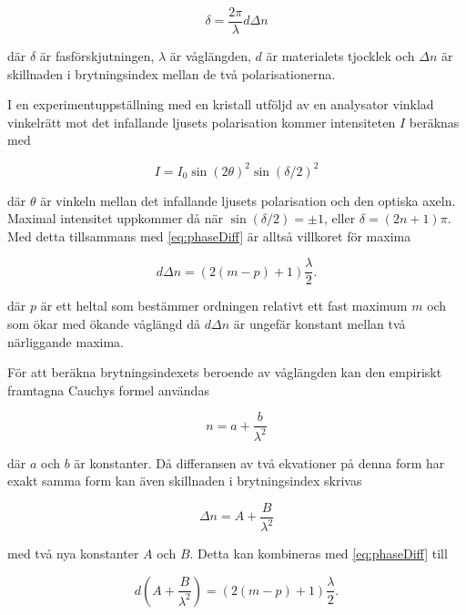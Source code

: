 \documentclass[a4paper]{article}
\begin{document}
\begin{equation}
	\delta = \frac{2\pi}{\lambda} d \Delta n
	\label{eq:phaseDiff}
\end{equation}

där $\delta$ är fasförskjutningen, $\lambda$ är våglängden, $d$ är materialets tjocklek och $\Delta n$ är skillnaden i brytningsindex mellan de två polarisationerna.

I en experimentuppställning med en kristall utföljd av en analysator vinklad vinkelrätt mot det infallande ljusets polarisation kommer intensiteten $I$ beräknas med \cite{labManual}

\begin{equation}
	I = I_0 \sin\left(2\theta\right)^2 \sin\left(\delta / 2\right)^2
\end{equation}

där $\theta$ är vinkeln mellan det infallande ljusets polarisation och den optiska axeln. Maximal intensitet uppkommer då när $\sin\left(\delta / 2\right) = \pm 1$, eller $\delta = \left(2 n + 1\right)\pi$. \cite{labManual} Med detta tillsammans med \eqref{eq:phaseDiff} är alltså villkoret för maxima

\begin{equation}
	d \Delta n = \left(2 (m - p) + 1\right)\frac{\lambda}{2}\text{.}
	\label{eq:deltaMax}
\end{equation}

där $p$ är ett heltal som bestämmer ordningen relativt ett fast maximum $m$ och som ökar med ökande våglängd då $d \Delta n$ är ungefär konstant mellan två närliggande maxima.

För att beräkna brytningsindexets beroende av våglängden kan den empiriskt framtagna Cauchys formel användas \cite{labManual} \cite[p.~67]{pearsonIntroOpt}

\begin{equation}
	n = a + \frac{b}{\lambda^2}
\end{equation}

där $a$ och $b$ är konstanter. Då differansen av två ekvationer på denna form har exakt samma form kan även skillnaden i brytningsindex skrivas

\begin{equation}
	\Delta n = A + \frac{B}{\lambda^2}
	\label{eq:deltaCauchy}
\end{equation}

med två nya konstanter $A$ och $B$. Detta kan kombineras med \eqref{eq:phaseDiff} till

\begin{equation}
	d \left(A + \frac{B}{\lambda^2}\right) = \left(2 (m - p) + 1\right)\frac{\lambda}{2}\text{.}
	\label{eq:cauchyMax}
\end{equation}
\end{document}
